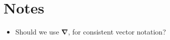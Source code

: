 \documentclass[10pt, a4paper, oneside]{book}
\begin{document}
    
    

    
    \setcounter{tocdepth}{1}
    \listoftodos
    
    \section*{Notes}
    \begin{itemize}
        \item Should we use $\bm \nabla$, for consistent vector notation?
    \end{itemize}
\end{document}
